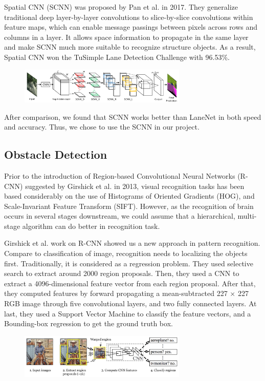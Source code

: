 \documentclass[runningheads]{llncs}
\begin{document}
Spatial CNN (SCNN) was proposed by Pan et al.
\cite{SpatialCNN} in 2017. They generalize traditional 
deep layer-by-layer convolutions to slice-by-slice 
convolutions within feature maps, which can enable message 
passings between pixels across rows and columns in a layer. 
It allows space information to propagate in the same layer 
and make SCNN much more suitable to recognize structure 
objects. As a result, Spatial CNN won the TuSimple Lane 
Detection Challenge with 96.53\%. 
\begin{figure}
    \centering
    \includegraphics[width=8cm]{reference/scnn}
    \label{fig:example}
\end{figure}

After comparison, we found that SCNN works better than 
LaneNet in both speed and accuracy. Thus, we chose to use 
the SCNN in our project. 


\subsection{Obstacle Detection}
Prior to the introduction of Region-based Convolutional 
Neural Networks (R-CNN) suggested by Girshick et al. 
\cite{RCNN} in 2013, visual recognition tasks has been 
based considerably on the use of Histograms of Oriented 
Gradients (HOG)\cite{HOG}, and Scale-Invariant Feature 
Transform (SIFT)\cite{SIFT}. However, as the recognition of 
brain occurs in several stages downstream, we could assume 
that a hierarchical, multi-stage algorithm can do better in 
recognition task. 

Girshick et al. work on R-CNN showed us a new approach in 
pattern recognition. Compare to classification of image, 
recognition needs to localizing the objects first. 
Traditionally, it is considered as a regression problem. 
They used selective search to extract around 2000 region 
proposals. Then, they used a CNN to extract a 
4096-dimensional feature vector from each region proposal. 
After that, they computed features by forward propagating
a mean-subtracted 227 × 227 RGB image through five 
convolutional layers, and two fully connected layers. At 
last, they used a Support Vector Machine to classify the 
feature vectors, and a Bounding-box regression to get the 
ground truth box. 
\begin{figure}
    \centering
    \includegraphics[width=8cm]{reference/rcnn}
    \label{fig:example}
\end{figure}
\end{document}
